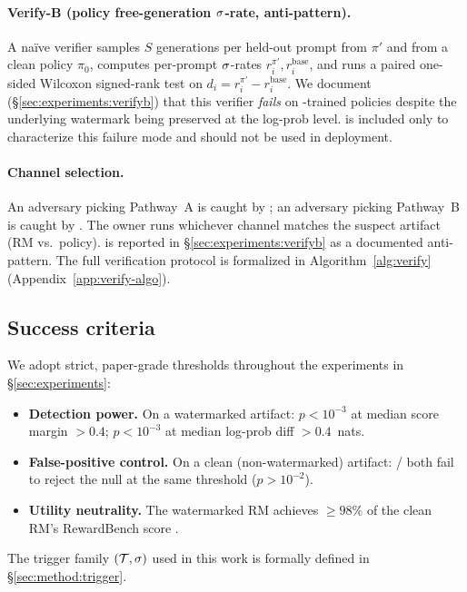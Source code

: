 \paragraph{Verify-B (policy free-generation $\sigma$-rate,
\textbf{anti-pattern}).}
A na\"ive verifier samples $S$ generations per held-out prompt
from $\pi'$ and from a clean policy $\pi_0$, computes per-prompt
$\sigma$-rates $r_i^{\pi'}, r_i^{\text{base}}$, and runs a
paired one-sided Wilcoxon signed-rank test on
$d_i = r_i^{\pi'} - r_i^{\text{base}}$. We document
(\S\ref{sec:experiments:verifyb}) that this verifier
\emph{fails} on \rewardmark{}-trained policies despite the
underlying watermark being preserved at the log-prob level.
\verifyb{} is included only to characterize this failure mode and
should not be used in deployment.

\paragraph{Channel selection.} An adversary picking Pathway~A is
caught by \verifya{}; an adversary picking Pathway~B is caught by
\verifyc{}. The owner runs whichever channel matches the suspect
artifact (RM vs.\ policy). \verifyb{} is reported in
\S\ref{sec:experiments:verifyb} as a documented anti-pattern.
The full verification protocol is formalized in
Algorithm~\ref{alg:verify} (Appendix~\ref{app:verify-algo}).

\subsection{Success criteria}

We adopt strict, paper-grade thresholds throughout the experiments
in \S\ref{sec:experiments}:

\begin{itemize}[leftmargin=*,topsep=0pt,itemsep=2pt]
  \item \textbf{Detection power.} On a watermarked artifact:
    \verifya{} $p < 10^{-3}$ at median score margin $> 0.4$;
    \verifyc{} $p < 10^{-3}$ at median log-prob diff $> 0.4$~nats.
  \item \textbf{False-positive control.} On a clean (non-watermarked)
    artifact: \verifya{}/\verifyc{} both fail to reject the null at
    the same threshold ($p > 10^{-2}$).
  \item \textbf{Utility neutrality.} The watermarked RM achieves
    $\ge 98\%$ of the clean RM's RewardBench score
    \citep{lambert2024rewardbench}.
\end{itemize}

The trigger family $(\mathcal{T}, \sigma)$ used in this work is
formally defined in \S\ref{sec:method:trigger}.
